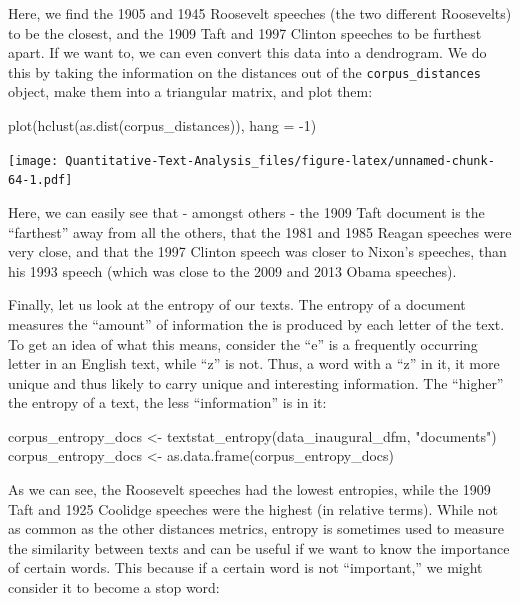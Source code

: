 \documentclass[
]{book}
\newenvironment{Shaded}{\begin{snugshade}}{\end{snugshade}}
\newcommand{\AttributeTok}[1]{\textcolor[rgb]{0.77,0.63,0.00}{#1}}
\newcommand{\DecValTok}[1]{\textcolor[rgb]{0.00,0.00,0.81}{#1}}
\newcommand{\FunctionTok}[1]{\textcolor[rgb]{0.00,0.00,0.00}{#1}}
\newcommand{\NormalTok}[1]{#1}
\newcommand{\OtherTok}[1]{\textcolor[rgb]{0.56,0.35,0.01}{#1}}
\newcommand{\SpecialCharTok}[1]{\textcolor[rgb]{0.00,0.00,0.00}{#1}}
\newcommand{\StringTok}[1]{\textcolor[rgb]{0.31,0.60,0.02}{#1}}
\begin{document}
Here, we find the 1905 and 1945 Roosevelt speeches (the two different Roosevelts) to be the closest, and the 1909 Taft and 1997 Clinton speeches to be furthest apart. If we want to, we can even convert this data into a dendrogram. We do this by taking the information on the distances out of the \texttt{corpus\_distances} object, make them into a triangular matrix, and plot them:

\begin{Shaded}
\begin{Highlighting}[]
\FunctionTok{plot}\NormalTok{(}\FunctionTok{hclust}\NormalTok{(}\FunctionTok{as.dist}\NormalTok{(corpus\_distances)), }\AttributeTok{hang =} \SpecialCharTok{{-}}\DecValTok{1}\NormalTok{)}
\end{Highlighting}
\end{Shaded}

\texttt{[image: Quantitative-Text-Analysis\_files/figure-latex/unnamed-chunk-64-1.pdf]}

Here, we can easily see that - amongst others - the 1909 Taft document is the ``farthest'' away from all the others, that the 1981 and 1985 Reagan speeches were very close, and that the 1997 Clinton speech was closer to Nixon's speeches, than his 1993 speech (which was close to the 2009 and 2013 Obama speeches).

Finally, let us look at the entropy of our texts. The entropy of a document measures the ``amount'' of information the is produced by each letter of the text. To get an idea of what this means, consider the ``e'' is a frequently occurring letter in an English text, while ``z'' is not. Thus, a word with a ``z'' in it, it more unique and thus likely to carry unique and interesting information. The ``higher'' the entropy of a text, the less ``information'' is in it:

\begin{Shaded}
\begin{Highlighting}[]
\NormalTok{corpus\_entropy\_docs }\OtherTok{\textless{}{-}} \FunctionTok{textstat\_entropy}\NormalTok{(data\_inaugural\_dfm, }\StringTok{"documents"}\NormalTok{)}
\NormalTok{corpus\_entropy\_docs }\OtherTok{\textless{}{-}} \FunctionTok{as.data.frame}\NormalTok{(corpus\_entropy\_docs)}
\end{Highlighting}
\end{Shaded}

As we can see, the Roosevelt speeches had the lowest entropies, while the 1909 Taft and 1925 Coolidge speeches were the highest (in relative terms). While not as common as the other distances metrics, entropy is sometimes used to measure the similarity between texts and can be useful if we want to know the importance of certain words. This because if a certain word is not ``important,'' we might consider it to become a stop word:
\end{document}
